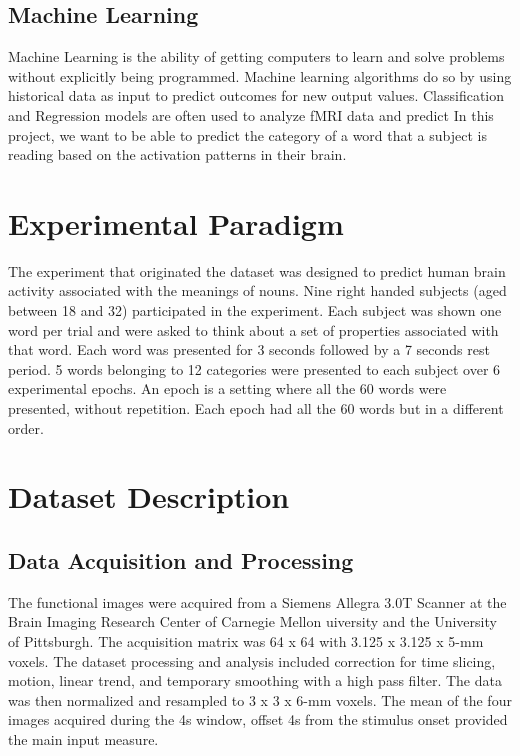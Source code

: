 \documentclass{article}
\begin{document}
\subsection{Machine Learning}

Machine Learning is the ability of getting computers to learn and solve problems without 
explicitly being programmed. Machine learning algorithms do so by using historical data as input
to predict outcomes for new output values. Classification and Regression models are often used 
to analyze fMRI data and predict  In this project, we want to be able to predict the category of a word 
that a subject is reading based on the activation patterns in their brain. 

\section{Experimental Paradigm}

The experiment that originated the dataset was designed to predict human brain activity associated with
the meanings of nouns. Nine right handed subjects (aged between 18 and 32) participated in the experiment. 
Each subject was shown one word per trial and were asked  to think about a set of properties associated
with that word. Each word was presented for 3 seconds followed by a 7 seconds rest period. 5 words 
belonging to 12 categories were presented to each subject over 6 experimental epochs. An epoch is a 
setting where all the 60 words were presented, without repetition. Each epoch had all the 60 words but in
a different order.

\section{Dataset Description}

\subsection{Data Acquisition and Processing}

The functional images were acquired from a Siemens Allegra 3.0T Scanner at the Brain Imaging Research Center
of Carnegie Mellon uiversity and the University of Pittsburgh. The acquisition matrix was 64 x 64 with
3.125 x 3.125 x 5-mm voxels.
The dataset processing and analysis included correction for time slicing, motion, linear trend, and temporary
smoothing with a high pass filter. The data was then normalized and resampled to 3 x 3 x 6-mm voxels. The
mean of the four images acquired during the 4s window, offset 4s from the stimulus onset provided the main
input measure.
\end{document}
